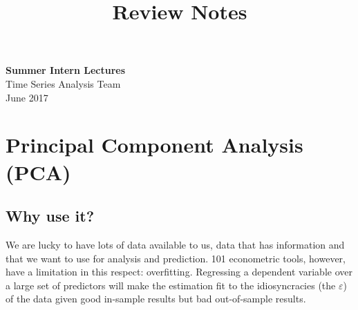 \documentclass[11pt]{article}
\theoremstyle{definition}
\begin{document}
\setcounter{section}{0}
\title{Review Notes}

\thispagestyle{empty}

\begin{center}
{\LARGE \bf Summer Intern Lectures}\\
{\large Time Series Analysis Team}\\
June 2017
\end{center}
\section{Principal Component Analysis (PCA)}
\subsection{Why use it?}
We are lucky to have lots of data available to us, data that has information and that we want to use for analysis and prediction. 101 econometric tools, however, have a limitation in this respect: overfitting. Regressing a dependent variable over a large set of predictors will make the estimation fit to the idiosyncracies (the $\varepsilon$) of the data given good in-sample results but bad out-of-sample results.
\end{document}
